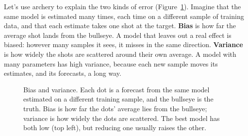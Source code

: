 Let's use archery to explain the two kinds of error (Figure~\ref{fig:19-targets}). Imagine that the same model is estimated many times, each time on a different sample of training data, and that each estimate takes one shot at the target. \textbf{Bias} is how far the average shot lands from the bullseye. A model that leaves out a real effect is biased: however many samples it sees, it misses in the same direction. \textbf{Variance} is how widely the shots are scattered around their own average. A model with many parameters has high variance, because each new sample moves its estimates, and its forecasts, a long way.


\begin{figure}[htbp]
  \centering
  \caption{Bias and variance. Each dot is a forecast from the same model
    estimated on a different training sample, and the bullseye is the truth.
    Bias is how far the dots' average lies from the bullseye; variance is how
    widely the dots are scattered. The best model has both low (top left), but
    reducing one usually raises the other.}
  \label{fig:19-targets}
\end{figure}

